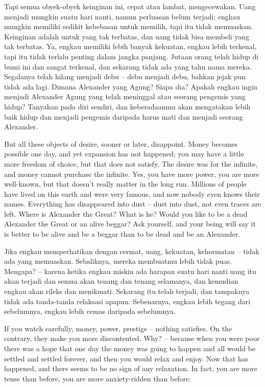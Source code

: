 \bahasa
Tapi semua obyek-obyek keinginan ini, cepat atau lambat, mengecewakan. Uang menjadi mungkin suatu hari nanti, namun perluasan belum terjadi; engkau mungkin memiliki sedikit kebebasan untuk memilih, tapi itu tidak memuaskan. Keinginan adalah untuk yang tak terbatas, dan uang tidak bisa membeli yang tak terbatas. Ya, engkau memiliki lebih banyak kekuatan, engkau lebih terkenal, tapi itu tidak terlalu penting dalam jangka panjang. Jutaan orang telah hidup di bumi ini dan sangat terkenal, dan sekarang tidak ada yang tahu nama mereka. Segalanya telah hilang menjadi debu -- debu menjadi debu, bahkan jejak pun tidak ada lagi. Dimana Alexander yang Agung? Siapa dia? Apakah engkau ingin menjadi Alexander Agung yang telah meninggal atau seorang pengemis yang hidup? Tanyakan pada diri sendiri, dan keberadaanmu akan mengatakan lebih baik hidup dan menjadi pengemis daripada harus mati dan menjadi seorang Alexander.

\english
But all these objects of desire, sooner or later, disappoint. Money becomes possible one day, and yet expansion has not happened; you may have a little more freedom of choice, but that does not satisfy. The desire was for the infinite, and money cannot purchase the infinite. Yes, you have more power, you are more well-known, but that doesn't really matter in the long run. Millions of people have lived on this earth and were very famous, and now nobody even knows their names. Everything has disappeared into dust -- dust into dust, not even traces are left. Where is Alexander the Great? What is he? Would you like to be a dead Alexander the Great or an alive beggar? Ask yourself, and your being will say it is better to be alive and be a beggar than to be dead and be an Alexander.

\bahasa
Jika engkau memperhatikan dengan cermat, uang, kekuatan, kehormatan -- tidak ada yang memuaskan. Sebaliknya, mereka membuatmu lebih tidak puas. Mengapa? -- karena ketika engkau miskin ada harapan suatu hari nanti uang itu akan terjadi dan semua akan tenang dan tenang selamanya, dan kemudian engkau akan rileks dan menikmati. Sekarang itu telah terjadi, dan tampaknya tidak ada tanda-tanda relaksasi apapun. Sebenarnya, engkau lebih tegang dari sebelumnya, engkau lebih cemas daripada sebelumnya.

\english
If you watch carefully, money, power, prestige -- nothing satisfies. On the contrary, they make you more discontented. Why? -- because when you were poor there was a hope that one day the money was going to happen and all would be settled and settled forever, and then you would relax and enjoy. Now that has happened, and there seems to be no sign of any relaxation. In fact, you are more tense than before, you are more anxiety-ridden than before.

